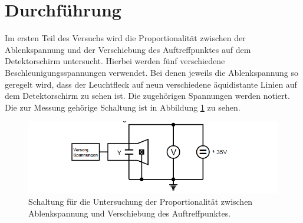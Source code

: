 \section{Durchführung}
Im ersten Teil des Versuchs wird die Proportionalität zwischen der Ablenkspannung und der
Verschiebung des Auftreffpunktes auf dem Detektorschirm untersucht. Hierbei werden
fünf verschiedene Beschleunigungsspannungen verwendet. Bei denen jeweils die Ablenkspannung
so geregelt wird, dass der Leuchtfleck auf neun verschiedene äquidistante Linien
auf dem Detektorschirm zu sehen ist. Die zugehörigen Spannungen werden notiert.
Die zur Messung gehörige Schaltung ist in Abbildung \ref{abb4} zu sehen.
\begin{figure}
  \centering
  \includegraphics[scale=0.5]{abl3.PNG}
  \caption{Schaltung für die Untersuchung der Proportionalität zwischen Ablenkspannung
  und Verschiebung des Auftreffpunktes. \cite{Q1}}
  \label{abb4}
\end{figure}
\FloatBarrier

